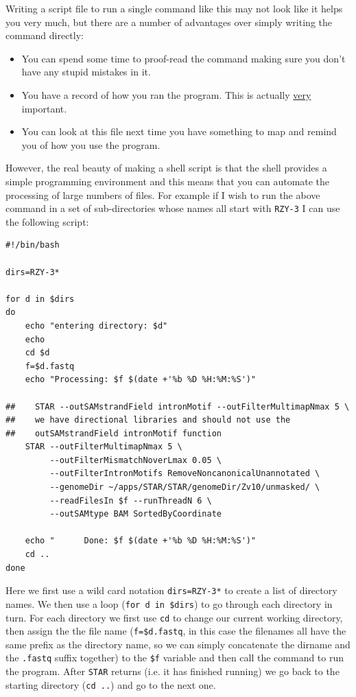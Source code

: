 \documentclass[11pt]{article}
\begin{document}
Writing a script file to run a single command like this may not look like it
helps you very much, but there are a number of advantages over simply writing
the command directly:
\begin{itemize}
\item You can spend some time to proof-read the command making sure you don't
have any stupid mistakes in it.
\item You have a record of how you ran the program. This is actually \uline{very}
  important.
\item You can look at this file next time you have something to map and remind
you of how you use the program.
\end{itemize}

However, the real beauty of making a shell script is that the shell provides
a simple programming environment and this means that you can automate the
processing of large numbers of files. For example if I wish to run the above
command in a set of sub-directories whose names all start with \texttt{RZY-3} I can
use the following script:

\begin{verbatim}
#!/bin/bash

dirs=RZY-3*

for d in $dirs
do
    echo "entering directory: $d"
    echo 
    cd $d
    f=$d.fastq
    echo "Processing: $f $(date +'%b %D %H:%M:%S')" 

##    STAR --outSAMstrandField intronMotif --outFilterMultimapNmax 5 \
##    we have directional libraries and should not use the 
##    outSAMstrandField intronMotif function
    STAR --outFilterMultimapNmax 5 \
         --outFilterMismatchNoverLmax 0.05 \
         --outFilterIntronMotifs RemoveNoncanonicalUnannotated \
         --genomeDir ~/apps/STAR/STAR/genomeDir/Zv10/unmasked/ \
         --readFilesIn $f --runThreadN 6 \
         --outSAMtype BAM SortedByCoordinate

    echo "      Done: $f $(date +'%b %D %H:%M:%S')" 
    cd ..
done
\end{verbatim}

Here we first use a wild card notation \texttt{dirs=RZY-3*} to create a list of
directory names. We then use a loop (\texttt{for d in \$dirs}) to go through each
directory in turn. For each directory we first use \texttt{cd} to change our current
working directory, then assign the the file name (\texttt{f=\$d.fastq}, in this case
the filenames all have the same prefix as the directory name, so we can
simply concatenate the dirname and the \texttt{.fastq} suffix together) to the \texttt{\$f}
variable and then call the command to run the program. After \texttt{STAR} returns
(i.e. it has finished running) we go back to the starting directory (\texttt{cd ..})
and go to the next one.
\end{document}
